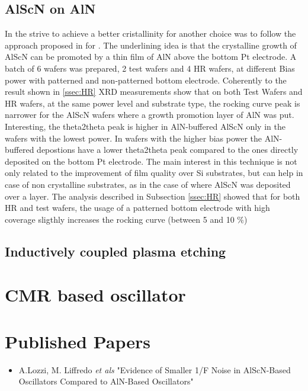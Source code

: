 \subsection{AlScN on AlN}
In the strive to achieve a better cristallinity for  another choice was to follow the approach proposed in \cite{parsapour_ex-situ_2017} for . The underlining idea is that the crystalline growth of AlScN can be promoted by a thin film of AlN above the bottom Pt electrode. A batch of 6 wafers was prepared, 2 test wafers and 4 HR wafers, at different Bias power with patterned and non-patterned bottom electrode. Coherently to the result shown in \ref{ssec:HR} XRD measurements show that on both Test Wafers and HR wafers, at the same power level and substrate type, the rocking curve peak is narrower for the AlScN wafers where a growth promotion layer of AlN was put. Interesting, the theta2theta peak is higher in AlN-buffered AlScN only in the wafers with the lowest power. In wafers with the higher bias power the AlN-buffered depostions have a lower theta2theta peak compared to the ones directly deposited on the bottom Pt electrode. The main interest in this technique is not only related to the improvement of film quality over Si substrates, but can help in case of non crystalline substrates, as in the case of \cite{parsapour_ex-situ_2017} where AlScN was deposited over a  layer.
The analysis described in Subsection \ref{ssec:HR} showed that for both HR and test wafers, the usage of a patterned bottom electrode with high coverage sligthly increases the rocking curve (between 5 and 10 \%) 

\subsection{Inductively coupled plasma etching}

\section{CMR based oscillator}

\section{Published Papers}
\begin{itemize}
	\item A.Lozzi, M. Liffredo \textit{et als} "Evidence of Smaller 1/F Noise in AlScN-Based Oscillators Compared to AlN-Based Oscillators" \cite{lozzi_evidence_2020}
\end{itemize}
